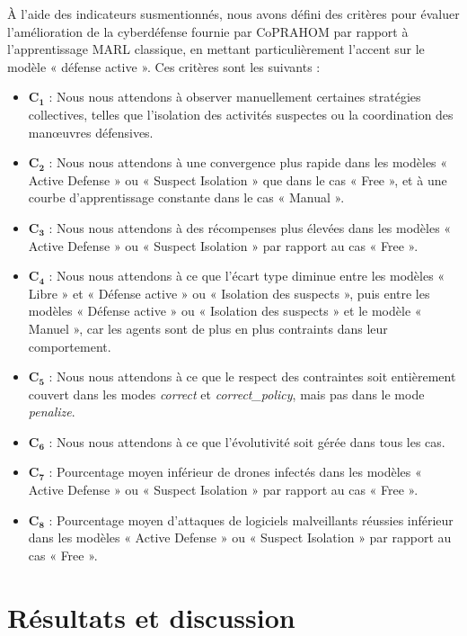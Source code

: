 À l'aide des indicateurs susmentionnés, nous avons défini des critères pour évaluer l'amélioration de la cyberdéfense fournie par CoPRAHOM par rapport à l'apprentissage MARL classique, en mettant particulièrement l'accent sur le modèle « défense active ». Ces critères sont les suivants :

\begin{itemize}
    \item $\mathbf{C_1}$ : Nous nous attendons à observer manuellement certaines stratégies collectives, telles que l'isolation des activités suspectes ou la coordination des manœuvres défensives.
    \item $\mathbf{C_2}$ : Nous nous attendons à une convergence plus rapide dans les modèles « Active Defense » ou « Suspect Isolation » que dans le cas « Free », et à une courbe d'apprentissage constante dans le cas « Manual ».
    \item $\mathbf{C_3}$ : Nous nous attendons à des récompenses plus élevées dans les modèles « Active Defense » ou « Suspect Isolation » par rapport au cas « Free ».
    \item $\mathbf{C_{4}}$ : Nous nous attendons à ce que l'écart type diminue entre les modèles « Libre » et « Défense active » ou « Isolation des suspects », puis entre les modèles « Défense active » ou « Isolation des suspects » et le modèle « Manuel », car les agents sont de plus en plus contraints dans leur comportement.
    \item $\mathbf{C_{5}}$ : Nous nous attendons à ce que le respect des contraintes soit entièrement couvert dans les modes \textit{correct} et \textit{correct\_policy}, mais pas dans le mode \textit{penalize}.
    \item $\mathbf{C_{6}}$ : Nous nous attendons à ce que l'évolutivité soit gérée dans tous les cas.
    \item $\mathbf{C_7}$ : Pourcentage moyen inférieur de drones infectés dans les modèles « Active Defense » ou « Suspect Isolation » par rapport au cas « Free ».
    \item $\mathbf{C_8}$ : Pourcentage moyen d'attaques de logiciels malveillants réussies inférieur dans les modèles « Active Defense » ou « Suspect Isolation » par rapport au cas « Free ».

\end{itemize}

\section{Résultats et discussion}\label{sec:results_and_discussion}

